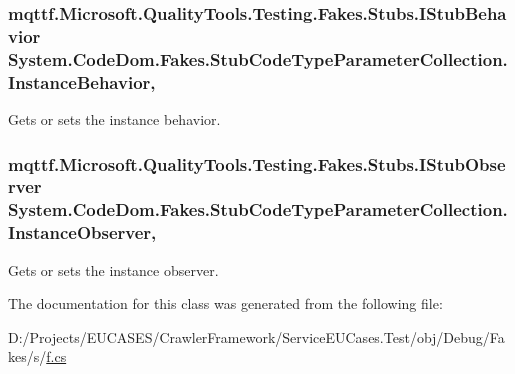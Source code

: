 \hypertarget{class_system_1_1_code_dom_1_1_fakes_1_1_stub_code_type_parameter_collection_a187f91eb32be04d9e7c744916cc4146e}{
\subsubsection[{Instance\-Behavior}]{\setlength{\rightskip}{0pt plus 5cm}mqttf.\-Microsoft.\-Quality\-Tools.\-Testing.\-Fakes.\-Stubs.\-I\-Stub\-Behavior System.\-Code\-Dom.\-Fakes.\-Stub\-Code\-Type\-Parameter\-Collection.\-Instance\-Behavior\hspace{0.3cm}{\ttfamily [get]}, {\ttfamily [set]}}}\label{class_system_1_1_code_dom_1_1_fakes_1_1_stub_code_type_parameter_collection_a187f91eb32be04d9e7c744916cc4146e}


Gets or sets the instance behavior.

\hypertarget{class_system_1_1_code_dom_1_1_fakes_1_1_stub_code_type_parameter_collection_a1bde81aa3ded743bd7e309db93aaf5f1}{
\subsubsection[{Instance\-Observer}]{\setlength{\rightskip}{0pt plus 5cm}mqttf.\-Microsoft.\-Quality\-Tools.\-Testing.\-Fakes.\-Stubs.\-I\-Stub\-Observer System.\-Code\-Dom.\-Fakes.\-Stub\-Code\-Type\-Parameter\-Collection.\-Instance\-Observer\hspace{0.3cm}{\ttfamily [get]}, {\ttfamily [set]}}}\label{class_system_1_1_code_dom_1_1_fakes_1_1_stub_code_type_parameter_collection_a1bde81aa3ded743bd7e309db93aaf5f1}


Gets or sets the instance observer.



The documentation for this class was generated from the following file\-:\begin{DoxyCompactItemize}
\item 
D\-:/\-Projects/\-E\-U\-C\-A\-S\-E\-S/\-Crawler\-Framework/\-Service\-E\-U\-Cases.\-Test/obj/\-Debug/\-Fakes/s/\hyperlink{s_2f_8cs}{f.\-cs}\end{DoxyCompactItemize}
